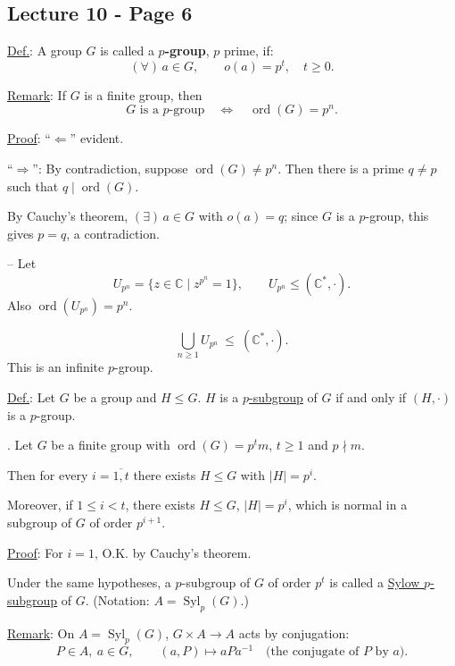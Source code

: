 
\subsection*{Lecture 10 - Page 6}

\noindent\underline{Def.}: A group $G$ is called a \textbf{$p$-group},
$p$ prime, if:
\[
(\forall)\,a\in G,\qquad o(a)=p^t,\quad t\geq 0.
\]

\medskip
\noindent\underline{Remark}: If $G$ is a finite group, then
\[
\boxed{G\text{ is a }p\text{-group}\quad\Longleftrightarrow\quad
\operatorname{ord}(G)=p^n}.
\]

\noindent\underline{Proof}: ``$\Leftarrow$'' evident.

\noindent ``$\Rightarrow$'': By contradiction, suppose
$\operatorname{ord}(G)\neq p^n$.
Then there is a prime $q\neq p$ such that $q\mid\operatorname{ord}(G)$.

\noindent By Cauchy's theorem, $(\exists)\,a\in G$ with $o(a)=q$;
since $G$ is a $p$-group, this gives $p=q$, a contradiction.

\bigskip
\noindent-- Let
\[
U_{p^n}=\{z\in\mathbb{C}\mid z^{p^n}=1\},
\qquad U_{p^n}\leq(\mathbb{C}^{*},\cdot).
\]
\noindent Also $\operatorname{ord}(U_{p^n})=p^n$.

\[
\bigcup_{n\geq 1}U_{p^n}\ \leq\ (\mathbb{C}^{*},\cdot).
\]
\noindent This is an infinite $p$-group.

\bigskip
\noindent\underline{Def.}: Let $G$ be a group and $H\leq G$.
$H$ is a \underline{$p$-subgroup} of $G$ if and only if
$(H,\cdot)$ is a $p$-group.

\bigskip
\noindent{}.
Let $G$ be a finite group with $\operatorname{ord}(G)=p^t m$,
$t\geq 1$ and $p\nmid m$.

\medskip
\noindent Then for every $i=\overline{1,t}$ there exists $H\leq G$
with $|H|=p^i$.

\medskip
\noindent Moreover, if $1\leq i<t$, there exists $H\leq G$,
$|H|=p^i$, which is normal in a subgroup of $G$
of order $p^{i+1}$.

\bigskip
\noindent\underline{Proof}: For $i=1$, O.K. by Cauchy's theorem.

\medskip
\noindent Under the same hypotheses, a $p$-subgroup of $G$
of order $p^t$ is called a \underline{Sylow $p$-subgroup} of $G$.
\quad (Notation: $A=\operatorname{Syl}_p(G)$.)

\bigskip
\noindent\underline{Remark}: On $A=\operatorname{Syl}_p(G)$,
$G\times A\longrightarrow A$ acts by conjugation:
\[
P\in A,\ a\in G,\qquad
(a,P)\longmapsto aPa^{-1}
\quad\text{(the conjugate of $P$ by $a$)}.
\]
